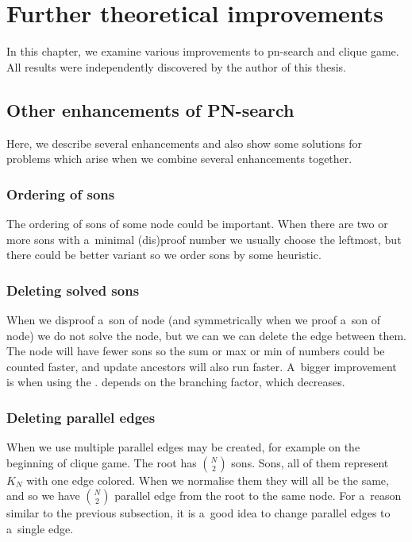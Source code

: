 \chapter{Further theoretical improvements}

In this chapter, we examine various improvements to pn-search and clique
game. All results
were independently discovered by the author of this thesis.

\section{Other enhancements of PN-search} 
Here, we describe several enhancements
and also show some solutions for problems which arise when we combine several
 enhancements together. 

\subsection{Ordering of sons} \label{ord}

The ordering of sons of some node could be important. When there are two or more
sons with a~minimal (dis)proof number we usually choose the leftmost, but there could
be better variant so we order sons by some heuristic.

\subsection{Deleting solved sons}

When we disproof a~son of  node (and symmetrically when we proof a~son
of  node) we do not solve the node, but we can we can delete the edge
between them. The node will have fewer sons so the sum or max or min of numbers
could be counted faster, and update ancestors will also run faster. A~bigger
improvement is when using the .  depends on
the branching factor, which decreases.

\subsection{Deleting parallel edges } \label{multi-edges} 

When we use  multiple parallel edges may be
created, for example on the beginning of clique game. The root has $N \choose
2$ sons. Sons, all of them represent $K_N$ with one edge colored. When we
normalise them they will all be the same, and so we have $N \choose 2$ parallel
edge from the root to the same node. For a~reason similar to the previous
subsection, it is a~good idea to change parallel edges to a~single edge.

